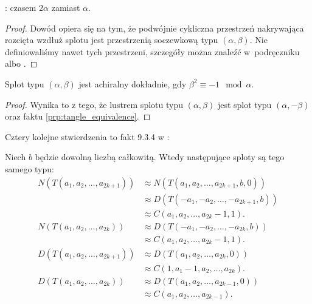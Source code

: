 \begin{tobedone}
    \cite[s. 23]{kawauchi96}: czasem $2\alpha$ zamiast $\alpha$.
\end{tobedone}

\begin{proof}
    Dowód opiera się na tym, że podwójnie cykliczna przestrzeń nakrywająca rozcięta wzdłuż splotu jest przestrzenią soczewkową typu $(\alpha, \beta)$.
    Nie definiowaliśmy nawet tych przestrzeni, szczegóły można znaleźć w~podręczniku \cite{murasugi96} albo \cite{schubert56}.
\end{proof}

\begin{proposition}
    \label{prp:chiral_tangles}
    Splot typu $(\alpha, \beta)$ jest achiralny dokładnie, gdy $\beta^2 \equiv -1 \mod \alpha$.
\end{proposition}

\begin{proof}
    Wynika to z tego, że lustrem splotu typu $(\alpha, \beta)$ jest splot typu $(\alpha, -\beta)$ oraz faktu \ref{prp:tangle_equivalence}.
\end{proof}

Cztery kolejne stwierdzenia to fakt 9.3.4 w \cite{murasugi96}:

\begin{proposition}
    Niech $b$ będzie dowolną liczbą całkowitą.
    Wtedy następujące sploty są tego samego typu:
    \begin{align}
        N(T(a_1, a_2, \ldots, a_{2k+1})) & \approx N(T(a_1, a_2, \ldots, a_{2k+1}, b, 0)) \\
                                         & \approx D(T(-a_1, -a_2, \ldots, -a_{2k+1}, b)) \\
                                         & \approx C(a_1, a_2, \ldots, a_{2k}-1, 1). \\
        N(T(a_1, a_2, \ldots, a_{2k}))   & \approx D(T(-a_1, -a_2, \ldots, -a_{2k}, b)) \\
                                         & \approx C(a_1, a_2, \ldots, a_{2k}-1, 1). \\
        D(T(a_1, a_2, \ldots, a_{2k+1})) & \approx D(T(a_1, a_2, \ldots, a_{2k}, 0)) \\
                                         & \approx C(1, a_1-1, a_2, \ldots, a_{2k}). \\
        D(T(a_1, a_2, \ldots, a_{2k}))   & \approx D(T(a_1, a_2, \ldots, a_{2k-1}, 0)) \\
                                         & \approx C(a_1, a_2, \ldots, a_{2k-1}).
    \end{align}
\end{proposition}

